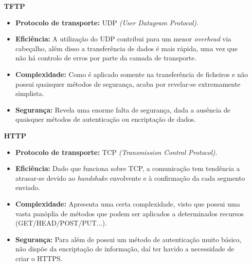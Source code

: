         \textbf{\large TFTP}
        \begin{itemize}
            
            \item \textbf{Protocolo de transporte:} UDP \textit{(User Datagram Protocol).}
            
            \item \textbf{Eficiência:} A utilização do UDP contribui para um menor \textit{overhead} via cabeçalho, além disso a transferência de dados é mais rápida, uma vez que não há controlo de erros por parte da camada de transporte.
            
            \item \textbf{Complexidade:} Como é aplicado somente na transferência de ficheiros e não possui quaisquer métodos de segurança, acaba por revelar-se extremamente simplista.
            
            \item \textbf{Segurança:} Revela uma enorme falta de segurança, dada a ausência de quaisquer métodos de autenticação ou encriptação de dados.

        \end{itemize}

        \textbf{\large HTTP}
        \begin{itemize}
         
            \item \textbf{Protocolo de transporte:} TCP \textit{(Transmission Control Protocol).} 
            
            \item \textbf{Eficiência:} Dado que funciona sobre TCP, a comunicação tem tendência a atrasar-se devido ao \textit{handshake} envolvente e à confirmação da cada segmento enviado.
            
            \item \textbf{Complexidade:} Apresenta uma certa complexidade, visto que possui uma vasta panóplia de métodos que podem ser aplicados a determinados recursos (GET/HEAD/POST/PUT...).
            
            \item \textbf{Segurança:} Para além de possui um método de autenticação muito básico, não dispõe da encriptação de informação, daí ter havido a necessidade de criar o HTTPS.
        
        \end{itemize}